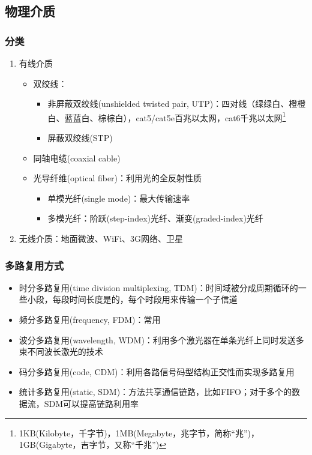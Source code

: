 \subsection{物理介质}
\subsubsection{分类}
\begin{enumerate}
\item 有线介质
\begin{itemize}
	\item 双绞线：
	\begin{itemize}
		\item 非屏蔽双绞线(unshielded twisted pair, UTP)：四对线（绿绿白、橙橙白、蓝蓝白、棕棕白），cat5/cat5e百兆以太网，cat6千兆以太网\footnote{1KB(Kilobyte，千字节)，1MB(Megabyte，兆字节，简称``兆'')，1GB(Gigabyte，吉字节，又称``千兆'')}
		\item 屏蔽双绞线(STP)
	\end{itemize}
	\item 同轴电缆(coaxial cable)
	\item 光导纤维(optical fiber)：利用光的全反射性质
	\begin{itemize}
		\item 单模光纤(single mode)：最大传输速率
		\item 多模光纤：阶跃(step-index)光纤、渐变(graded-index)光纤
	\end{itemize}
\end{itemize}
\item 无线介质：地面微波、WiFi、3G网络、卫星
\end{enumerate}

\subsubsection{多路复用方式}
\begin{itemize}
	\item 时分多路复用(time division multiplexing, TDM)：时间域被分成周期循环的一些小段，每段时间长度是的，每个时段用来传输一个子信道
	\item 频分多路复用(frequency, FDM)：常用
	\item 波分多路复用(wavelength, WDM)：利用多个激光器在单条光纤上同时发送多束不同波长激光的技术
	\item 码分多路复用(code, CDM)：利用各路信号码型结构正交性而实现多路复用
	\item 统计多路复用(static, SDM)：方法共享通信链路，比如FIFO；对于多个的数据流，SDM可以提高链路利用率
\end{itemize}

